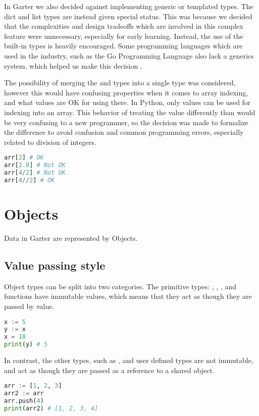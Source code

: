 In Garter we also decided against implementing generic or templated types. The
dict and list types are instead given special status. This was because we
decided that the complexities and design tradeoffs which are involved in this
complex feature were unnecessary, especially for early learning. Instead, the
use of the built-in types is heavily encouraged. Some programming languages
which are used in the industry, such as the Go Programming Language also lack a
generics system, which helped us make this decision \cite{golangweb}.

The possibility of merging the  and  types into a single
 type was considered, however this would have confusing properties
when it comes to array indexing, and what values are OK for using there. In
Python, only  values can be used for indexing into an array. This
behavior of treating the value  differently than  would be
very confusing to a new programmer, so the decision was made to formalize the
difference to avoid confusion and common programming errors, especially related
to division of integers.

\begin{lstlisting}[language=Python]
arr[2] # OK
arr[2.0] # Not OK
arr[4/2] # Not OK
arr[4//2] # OK
\end{lstlisting}

\section{Objects}
Data in Garter are represented by Objects. 

\subsection{Value passing style}
Object types can be split into two categories. The primitive
types: , , ,  and functions have
immutable values, which means that they act as though they are passed by value.

\begin{lstlisting}[language=Python]
x := 5
y := x
x = 10
print(y) # 5
\end{lstlisting}

In contrast, the other types, such as \code{[T]},  and user defined types
are not immutable, and act as though they are passed as a reference to a shared object.

\begin{lstlisting}[language=Python]
arr := [1, 2, 3]
arr2 := arr
arr.push(4)
print(arr2) # [1, 2, 3, 4]
\end{lstlisting}

